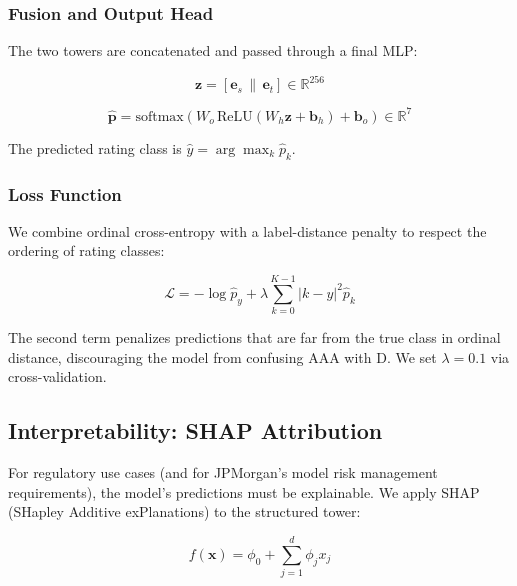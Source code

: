 \documentclass[12pt, a4paper]{article}
\begin{document}
\subsubsection{Fusion and Output Head}

The two towers are concatenated and passed through a final MLP:

\begin{equation}
  \mathbf{z} = \left[\mathbf{e}_s \,\|\, \mathbf{e}_t\right] \in \mathbb{R}^{256}
\end{equation}

\begin{equation}
  \hat{\mathbf{p}} = \text{softmax}\!\left(W_o \,\text{ReLU}\!\left(W_h \mathbf{z} + \mathbf{b}_h\right) + \mathbf{b}_o\right) \in \mathbb{R}^7
\end{equation}

The predicted rating class is $\hat{y} = \arg\max_k \hat{p}_k$.

\subsubsection{Loss Function}
\label{sec:loss}

We combine ordinal cross-entropy with a label-distance penalty to respect the ordering of rating classes:

\begin{equation}
  \mathcal{L} = -\log \hat{p}_y + \lambda \sum_{k=0}^{K-1} |k - y|^2 \hat{p}_k
  \label{eq:loss}
\end{equation}

The second term penalizes predictions that are far from the true class in ordinal distance, discouraging the model from confusing AAA with D.  We set $\lambda = 0.1$ via cross-validation.

\subsection{Interpretability: SHAP Attribution}
\label{sec:shap}

For regulatory use cases (and for JPMorgan's model risk management requirements), the model's predictions must be explainable.  We apply SHAP (SHapley Additive exPlanations) \citep{lundberg2017shap} to the structured tower:

\begin{equation}
  f(\mathbf{x}) = \phi_0 + \sum_{j=1}^{d} \phi_j x_j
\end{equation}
\end{document}
